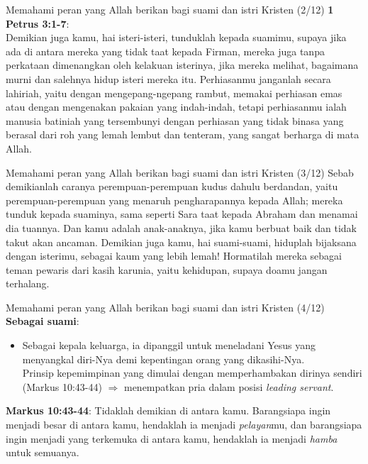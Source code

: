 \documentclass{beamer}
\theoremstyle{mystyle}
\let\emph\relax %
\begin{document}
\begin{frame}{Memahami peran yang Allah berikan bagi suami dan istri Kristen (2/12)}
	\textbf{1 Petrus 3:1-7}: \emph{Hidup bersama suami isteri} \\
	Demikian juga kamu, hai isteri-isteri, tunduklah kepada suamimu, supaya jika ada di antara mereka yang tidak taat kepada Firman, mereka juga tanpa perkataan dimenangkan oleh kelakuan isterinya, jika mereka melihat, bagaimana murni dan salehnya hidup isteri mereka itu. Perhiasanmu janganlah secara lahiriah, yaitu dengan mengepang-ngepang rambut, memakai perhiasan emas atau dengan mengenakan pakaian yang indah-indah, tetapi perhiasanmu ialah manusia batiniah yang tersembunyi dengan perhiasan yang tidak binasa yang berasal dari roh yang lemah lembut dan tenteram, yang sangat berharga di mata Allah. 
\end{frame}

\begin{frame}{Memahami peran yang Allah berikan bagi suami dan istri Kristen (3/12)}
Sebab demikianlah caranya perempuan-perempuan kudus dahulu berdandan, yaitu perempuan-perempuan yang menaruh pengharapannya kepada Allah; mereka tunduk kepada suaminya, sama seperti Sara taat kepada Abraham dan menamai dia tuannya. Dan kamu adalah anak-anaknya, jika kamu berbuat baik dan tidak takut akan ancaman. Demikian juga kamu, hai suami-suami, hiduplah bijaksana dengan isterimu, sebagai kaum yang lebih lemah! Hormatilah mereka sebagai teman pewaris dari kasih karunia, yaitu kehidupan, supaya doamu jangan terhalang.  	
\end{frame}

\begin{frame}{Memahami peran yang Allah berikan bagi suami dan istri Kristen (4/12)}
	\textbf{Sebagai suami}:
	\begin{itemize}
		\item Sebagai kepala keluarga, ia dipanggil untuk meneladani Yesus yang menyangkal diri-Nya demi kepentingan orang yang dikasihi-Nya. \\
		Prinsip kepemimpinan yang dimulai dengan memperhambakan dirinya sendiri (Markus 10:43-44) $\Longrightarrow$ menempatkan pria dalam posisi \textit{leading servant}.											
	\end{itemize}

	\bigskip	
	
	\textbf{Markus 10:43-44}: Tidaklah demikian di antara kamu. Barangsiapa ingin menjadi besar di antara kamu, hendaklah ia menjadi \textit{pelayan}mu, dan barangsiapa ingin menjadi yang terkemuka di antara kamu, hendaklah ia menjadi \textit{hamba} untuk semuanya.
\end{frame}
\end{document}
